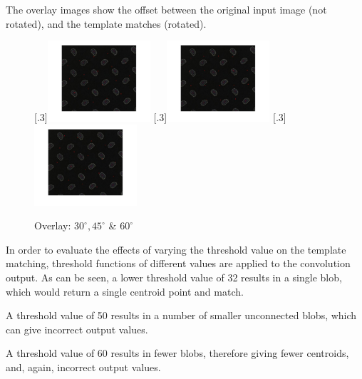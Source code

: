\documentclass[a4paper]{article}
\begin{document}
	\par The overlay images show the offset between the original input
	image (not rotated), and the template matches (rotated).
	\begin{figure}[H]
		\centering
		[.3\linewidth]{\includegraphics[height=3cm]{Results/Q3/a/qaOverlay30.jpg}}%
		[.3\linewidth]{\includegraphics[height=3cm]{Results/Q3/a/qaOverlay45.jpg}}%
		[.3\linewidth]{\includegraphics[height=3cm]{Results/Q3/a/qaOverlay60.jpg}}%
		\caption{Overlay: $30^\circ, 45^\circ$ \& $60^\circ$}
		\label{fig:}
	\end{figure}
	\par In order to evaluate the effects of varying the threshold value on
	the template matching, threshold functions of different values are
	applied to the convolution output. As can be seen, a lower threshold
	value of 32 results in a single blob, which would return a single
	centroid point and match.
	\par A threshold value of 50 results in a number of smaller unconnected
	blobs, which can give incorrect output values.
	\par A threshold value of 60 results in fewer blobs, therefore giving
	fewer centroids, and, again, incorrect output values.
\end{document}
